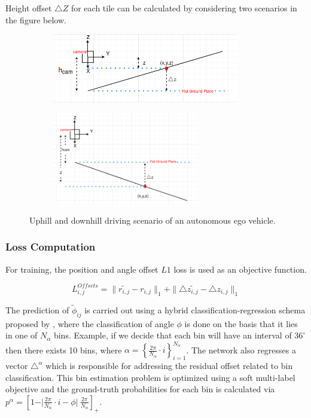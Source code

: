         
        Height offset $\triangle Z$ for each tile can be calculated by considering two scenarios in the figure below. 
        \begin{figure}[h]
        \centering
        \begin{subfigure}{0.4\textwidth}
        \includegraphics[width=1.2\linewidth, height=3cm]{images/delta_z_uphill.png} 
        \caption{}
        \label{fig:subim1}
        \end{subfigure}
        \begin{subfigure}{0.4\textwidth}
        \includegraphics[width=1\linewidth, height=4cm]{images/delat_z_downhill.png}
        \caption{}
        \label{fig:subim2}
        \end{subfigure}
        
        \caption{Uphill and downhill driving scenario of an autonomous ego vehicle.}
        \label{fig:image2}
        \end{figure}
        
        
        \subsubsection{Loss Computation}
            For training, the position and angle offset $L1$ loss is used as an objective function. 
            
            \begin{equation}
                L^{Offsets}_{i,j} = \parallel \widetilde{r_{i,j}} - r_{i,j} \parallel_{1} + \parallel \triangle{\widetilde{z_{i,j}}} - \triangle{z_{i,j}} \parallel_{1} 
             \end{equation}
             
             The prediction of $\widetilde{\phi}_{ij}$ is carried out using a hybrid classification-regression schema proposed by \cite{}, where the classification of angle $\phi$ is done on the basis that it lies in one of $N_{\alpha}$ bins. Example, if we decide that each bin will have an interval of $36^{\circ}$ then there exists 10 bins, where $\alpha = \left\{\frac{2\pi}{N_{\alpha} } \cdot i \right\}^{N_{\alpha}}_{i =1} $. The network also regresses a vector $\triangle^{\alpha}$ which is responsible for addressing the residual offset related to bin classification. This bin estimation problem is optimized using a soft multi-label objective and the ground-truth probabilities for each bin is calculated via $ p^{\alpha} = [1 - \vert \frac{2\pi}{N_{\alpha}} \cdot i  - \phi  \vert \ \frac{2\pi}{N_{\alpha}} ]_{+}$.
             

